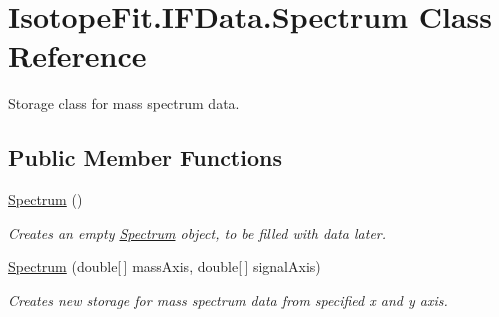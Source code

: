 \hypertarget{class_isotope_fit_1_1_i_f_data_1_1_spectrum}{}\section{Isotope\+Fit.\+I\+F\+Data.\+Spectrum Class Reference}
\label{class_isotope_fit_1_1_i_f_data_1_1_spectrum}


Storage class for mass spectrum data.  


\subsection*{Public Member Functions}
\begin{DoxyCompactItemize}
\item 
\mbox{\hyperlink{class_isotope_fit_1_1_i_f_data_1_1_spectrum_a57f4b9355944433a34eb668f22bb1f17}{Spectrum}} ()
\begin{DoxyCompactList}\small\item\em Creates an empty \mbox{\hyperlink{class_isotope_fit_1_1_i_f_data_1_1_spectrum}{Spectrum}} object, to be filled with data later. \end{DoxyCompactList}\item 
\mbox{\hyperlink{class_isotope_fit_1_1_i_f_data_1_1_spectrum_a0422d7cbabadc258d3dc6f1fd51f2e36}{Spectrum}} (double\mbox{[}$\,$\mbox{]} mass\+Axis, double\mbox{[}$\,$\mbox{]} signal\+Axis)
\begin{DoxyCompactList}\small\item\em Creates new storage for mass spectrum data from specified x and y axis. \end{DoxyCompactList}\end{DoxyCompactItemize}
